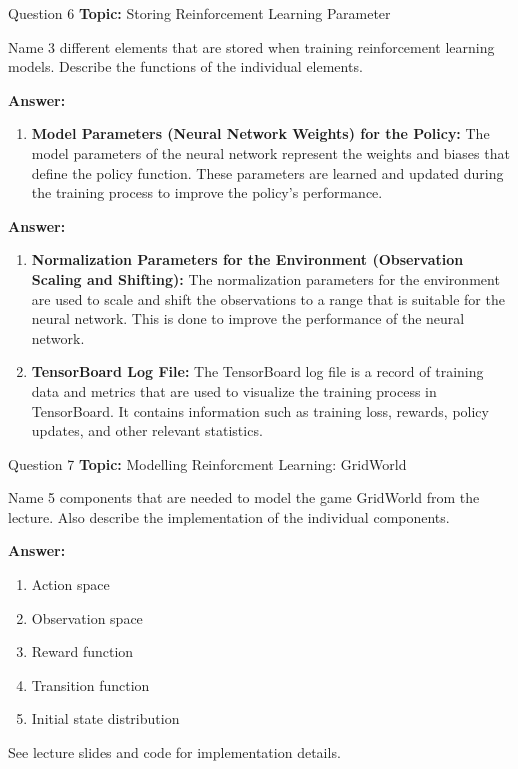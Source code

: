 \begin{frame}{Question 6}
    \textbf{Topic:} Storing Reinforcement Learning Parameter
    \vspace{10pt}

    Name 3 different elements that are stored when training reinforcement learning models. Describe the functions of the individual elements.

    \vspace{20pt}

    \textbf{Answer:} 
    \begin{enumerate}
        \item \textbf{Model Parameters (Neural Network Weights) for the Policy:} The model parameters of the neural network represent the weights and biases that define the policy function. These parameters are learned and updated during the training process to improve the policy's performance.
    \end{enumerate}
\end{frame}
\begin{frame}
    \textbf{Answer:}
    \begin{enumerate}[2.]
        \item \textbf{Normalization Parameters for the Environment (Observation Scaling and Shifting):} The normalization parameters for the environment are used to scale and shift the observations to a range that is suitable for the neural network. This is done to improve the performance of the neural network.
        \item \textbf{TensorBoard Log File:} The TensorBoard log file is a record of training data and metrics that are used to visualize the training process in TensorBoard. It contains information such as training loss, rewards, policy updates, and other relevant statistics.
    \end{enumerate}
\end{frame}

\begin{frame}{Question 7}
    \textbf{Topic:} Modelling Reinforcment Learning: GridWorld
    \vspace{10pt}

    Name 5 components that are needed to model the game GridWorld from the lecture. Also describe the implementation of the individual components.  
    \vspace{20pt}

    \textbf{Answer:} 
    \begin{enumerate}
        \item Action space
        \item Observation space
        \item Reward function
        \item Transition function
        \item Initial state distribution
    \end{enumerate}
    See lecture slides and code for implementation details.
\end{frame}

